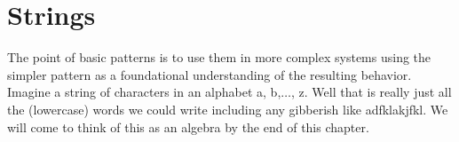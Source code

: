 \chapter{Strings}
The point of basic patterns is to use them in more complex systems using the
simpler pattern as a foundational understanding of the resulting behavior.
Imagine a string of characters in an alphabet a, b,$\ldots$, z.  Well that 
is really just all the (lowercase) words we could write including any 
gibberish like adfklakjfkl.  We will come to think of this as an algebra 
by the end of this chapter.

